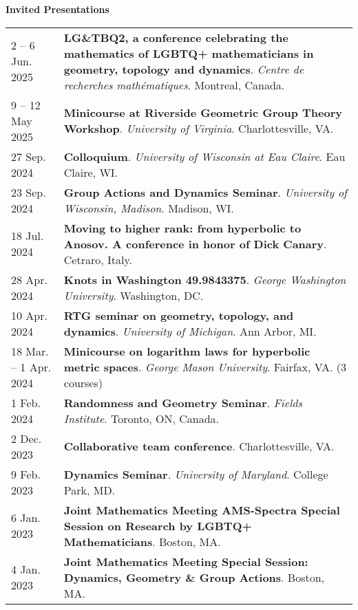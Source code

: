 
    \medskip


    \medskip
    \medskip



    \textbf{\large Invited Presentations}
    
    \begin{center}
    {
    \renewcommand{\arraystretch}{1.5}
    \begin{longtable}{p{}  p{}}
    2  -- 6 Jun.  2025 & \textbf{LG\&TBQ2, a conference celebrating the mathematics of LGBTQ+ mathematicians in geometry, topology and dynamics}. \textit{Centre de recherches math\'ematiques}.  Montreal, Canada.  \\ 
9  -- 12 May  2025 & \textbf{Minicourse at Riverside Geometric Group Theory Workshop}. \textit{University of Virginia}.  Charlottesville, VA.  \\ 
27 Sep.  2024 & \textbf{Colloquium}. \textit{University of Wisconsin at Eau Claire}.  Eau Claire, WI.  \\ 
23 Sep.  2024 & \textbf{Group Actions and Dynamics Seminar}. \textit{University of Wisconsin, Madison}.  Madison, WI.  \\ 
18 Jul.  2024 & \textbf{Moving to higher rank: 
from hyperbolic to Anosov.
A conference in honor of Dick Canary}.  Cetraro, Italy.  \\ 
28 Apr.  2024 & \textbf{Knots in Washington 49.9843375}. \textit{George Washington University}.  Washington, DC.  \\ 
10 Apr.  2024 & \textbf{RTG seminar on geometry, topology, and dynamics}. \textit{University of Michigan}.  Ann Arbor, MI.  \\ 
18 Mar.  -- 1 Apr.  2024 & \textbf{Minicourse on logarithm laws for hyperbolic metric spaces}. \textit{George Mason University}.  Fairfax, VA. (3 courses) \\ 
1 Feb.  2024 & \textbf{Randomness and Geometry Seminar}. \textit{Fields Institute}.  Toronto, ON, Canada.  \\ 
2 Dec.  2023 & \textbf{Collaborative team conference}.  Charlottesville, VA.  \\ 
9 Feb.  2023 & \textbf{Dynamics Seminar}. \textit{University of Maryland}.  College Park, MD.  \\ 
6 Jan.  2023 & \textbf{Joint Mathematics Meeting AMS-Spectra Special Session on Research by LGBTQ+ Mathematicians}.  Boston, MA.  \\ 
4 Jan.  2023 & \textbf{Joint Mathematics Meeting Special Session: Dynamics, Geometry \& Group Actions}.  Boston, MA.  \\ 

\end{longtable}}
\end{center}
